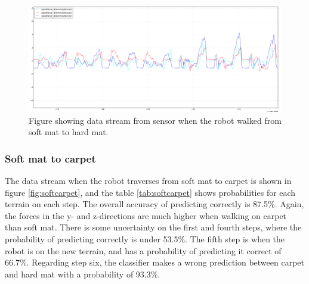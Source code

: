\documentclass[USenglish]{ifimaster}  %
\begin{document}
	\begin{figure}[h]
		\centering
		\includegraphics[width=\textwidth,height=\textheight,keepaspectratio]{Figures/MM_4Resten_MB}
		\caption{Figure showing data stream from sensor when the robot walked from soft mat to hard mat.}
		\label{fig:MM_4_Resten_BGraf}
	\end{figure}
	
	\begin{table}[h]
		\centering
		\caption{The table showing probability of each terrain per step walking from soft mat to hard mat. Marked green represent correct prediction and correct terrain, red represent wrong prediction and yellow is the correct prediction if it got wrong.}
		\label{MM4MB}
	\end{table}
	\FloatBarrier
	\clearpage
\subsubsection{Soft mat to carpet}
The data stream when the robot traverses from soft mat to carpet is shown in figure \ref{fig:softcarpet}, and the table \ref{tab:softcarpet} shows probabilities for each terrain on each step. The overall accuracy of predicting correctly is 87.5\%. Again, the forces in the y- and z-directions are much higher when walking on carpet than soft mat. There is some uncertainty on the first and fourth steps, where the probability of predicting correctly is under 53.5\%. The fifth step is when the robot is on the new terrain, and has a probability of predicting it correct of 66.7\%. Regarding step six, the classifier makes a wrong prediction between carpet and hard mat with a probability of 93.3\%.
	
\end{document}
